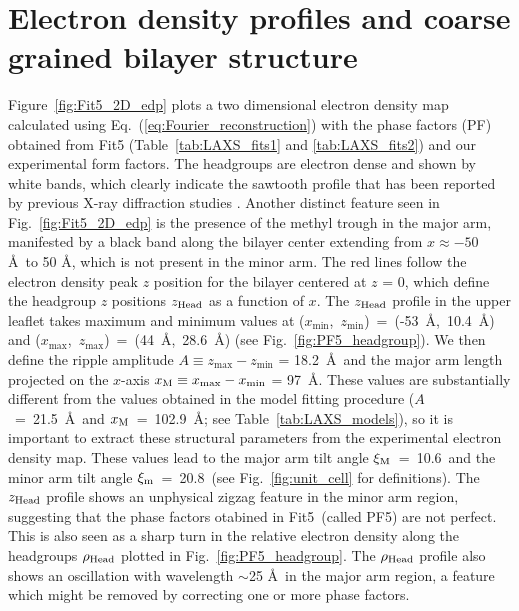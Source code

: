 \section{Electron density profiles and coarse grained bilayer structure}\label{sec:LAXS_edp}
Figure~\ref{fig:Fit5_2D_edp} plots a two dimensional electron density map calculated
using Eq.~(\ref{eq:Fourier_reconstruction})
with the phase factors (PF) obtained from Fit5 (Table~\ref{tab:LAXS_fits1} and \ref{tab:LAXS_fits2}) 
and our experimental form factors.
The headgroups are electron dense and shown by white bands, which clearly indicate
the sawtooth profile that has been reported by
previous X-ray diffraction studies \cite{ref:Sun96,ref:Sengupta03,ref:Pabst04}.
Another distinct feature seen in Fig.~\ref{fig:Fit5_2D_edp} is the 
presence of the methyl trough in the major arm, 
manifested by a black band along the bilayer center extending from 
$x \approx -50$ \AA\ to 50 \AA, which is not present in the minor arm.
The red lines follow the electron density peak $z$ position for the bilayer
centered at $z$ = 0, which define the headgroup $z$ positions $z_\text{Head}$ as a function of $x$.
The $z_\text{Head}$ profile in the upper leaflet takes maximum and minimum values
at ($x_\text{min}$,~$z_\text{min}$)~=~(-53~\AA,~10.4~\AA) and 
($x_\text{max}$,~$z_\text{max}$)~=~(44~\AA,~28.6~\AA)
(see Fig.~\ref{fig:PF5_headgroup}).
We then define the ripple amplitude $A \equiv z_\text{max}-z_\text{min}$ = 18.2~\AA\ and
the major arm length projected on the $x$-axis $x_\textrm{M} \equiv x_\text{max}-x_\text{min}$ = 97~\AA.
These values are substantially different from the values obtained in the model fitting 
procedure ($A$~=~21.5~\AA\ and $x_\textrm{M}$~=~102.9~\AA; see Table~\ref{tab:LAXS_models}), 
so it is important to extract these structural parameters from the 
experimental electron density map. 
These values lead to the major arm tilt angle $\xi_\text{M}$~=~10.6\textdegree\ and 
the minor arm tilt angle $\xi_\text{m}$~=~20.8\textdegree\
(see Fig.~\ref{fig:unit_cell} for definitions).
The $z_\text{Head}$ profile shows an unphysical zigzag feature in the minor arm region,
suggesting that the phase factors otabined in Fit5~(called PF5) are not perfect. This is also
seen as a sharp turn in the relative electron density along the headgroups 
$\rho_\text{Head}$ plotted in Fig.~\ref{fig:PF5_headgroup}. 
The $\rho_\text{Head}$ profile also shows an oscillation with wavelength $\sim$25 \AA\
in the major arm region,
a feature which might be removed by correcting one or more phase factors.

